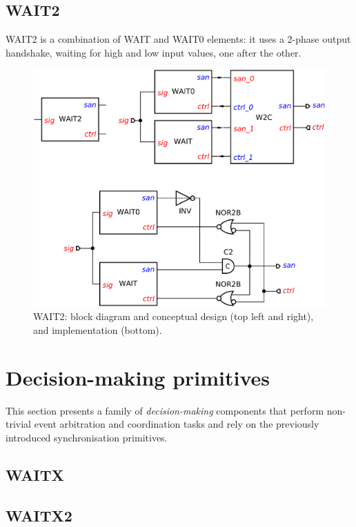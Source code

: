 \documentclass[conference]{IEEEtran}
\begin{document}
\subsection{\textsf{WAIT2}}
\textsf{WAIT2} is a combination of \textsf{WAIT} and \textsf{WAIT0} elements:
it uses a 2-phase output handshake, waiting for high and low input values, one after
the other.

\begin{figure}
\begin{center}
    \includegraphics[scale=0.23]{fig/WAIT2.pdf}
    \caption{\textsf{WAIT2}: block diagram and conceptual design (top left and right),
    and implementation (bottom).}
    \label{fig:wait2}
\end{center}
\end{figure}

\section{Decision-making primitives}

This section presents a family of \emph{decision-making} components that perform
non-trivial event arbitration and coordination tasks and rely on the previously
introduced synchronisation primitives.

\subsection{WAITX}
\subsection{WAITX2}
\end{document}
